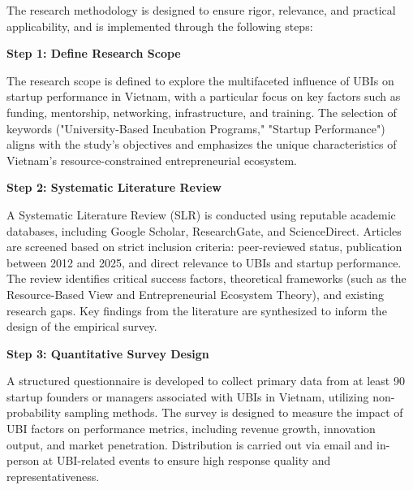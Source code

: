 \documentclass[../Main.tex]{subfiles}
\begin{document}
	The research methodology is designed to ensure rigor, relevance, and practical applicability, and is implemented through the following steps:

	\begin{center}
	\begin{minipage}[c]{0.6\textwidth}
		\vspace*{\fill}
	\textbf{Step 1: Define Research Scope}

	The research scope is defined to explore the multifaceted influence of UBIs on startup performance in Vietnam, with a particular focus on key factors such as funding, mentorship, networking, infrastructure, and training. The selection of keywords ("University-Based Incubation Programs," "Startup Performance") aligns with the study's objectives and emphasizes the unique characteristics of Vietnam's resource-constrained entrepreneurial ecosystem.

	\textbf{Step 2: Systematic Literature Review}

	A Systematic Literature Review (SLR) is conducted using reputable academic databases, including Google Scholar, ResearchGate, and ScienceDirect. Articles are screened based on strict inclusion criteria: peer-reviewed status, publication between 2012 and 2025, and direct relevance to UBIs and startup performance. The review identifies critical success factors, theoretical frameworks (such as the Resource-Based View and Entrepreneurial Ecosystem Theory), and existing research gaps. Key findings from the literature are synthesized to inform the design of the empirical survey.

	\textbf{Step 3: Quantitative Survey Design}

	A structured questionnaire is developed to collect primary data from at least 90 startup founders or managers associated with UBIs in Vietnam, utilizing non-probability sampling methods. The survey is designed to measure the impact of UBI factors on performance metrics, including revenue growth, innovation output, and market penetration. Distribution is carried out via email and in-person at UBI-related events to ensure high response quality and representativeness.


\end{minipage}
\end{center}
\end{document}

